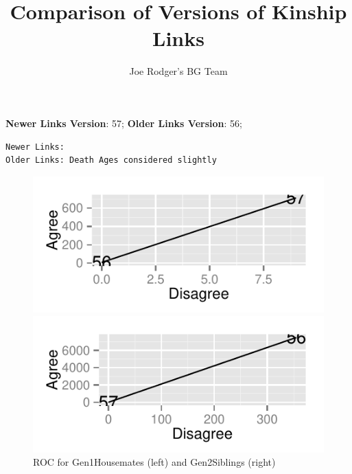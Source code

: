 \documentclass[a4paper]{article}\usepackage{graphicx, color}
\title{Comparison of Versions of Kinship Links}
\author{Joe Rodger's BG Team}
\makeatletter
\def\maxwidth{ %
  \ifdim\Gin@nat@width>\linewidth
    \linewidth
  \else
    \Gin@nat@width
  \fi
}
\newenvironment{kframe}{%
 \def\at@end@of@kframe{}%
 \ifinner\ifhmode%
  \def\at@end@of@kframe{\end{minipage}}%
  \begin{minipage}{\columnwidth}%
 \fi\fi%
 \def\FrameCommand##1{\hskip\@totalleftmargin \hskip-\fboxsep
 \colorbox{shadecolor}{##1}\hskip-\fboxsep
     \hskip-\linewidth \hskip-\@totalleftmargin \hskip\columnwidth}%
 \MakeFramed {\advance\hsize-\width
   \@totalleftmargin\z@ \linewidth\hsize
   \@setminipage}}%
 {\par\unskip\endMakeFramed%
 \at@end@of@kframe}
\newenvironment{knitrout}{}{} %
\makeatother
\begin{document}
\maketitle

\setlength{\parindent}{0pt}%







\textbf{Newer Links Version}: 57;
\textbf{Older Links Version}: 56;

\begin{knitrout}
\color{fgcolor}\begin{kframe}
\begin{verbatim}
Newer Links:
Older Links: Death Ages considered slightly
\end{verbatim}
\end{kframe}
\end{knitrout}


\begin{figure}[htbp]
\begin{knitrout}
\color{fgcolor}
\includegraphics[width=\maxwidth]{figure/unnamed-chunk-31} 

\includegraphics[width=\maxwidth]{figure/unnamed-chunk-32} 

\end{knitrout}

\caption{ROC for Gen1Housemates (left) and Gen2Siblings (right)}
\end{figure}
\end{document}
